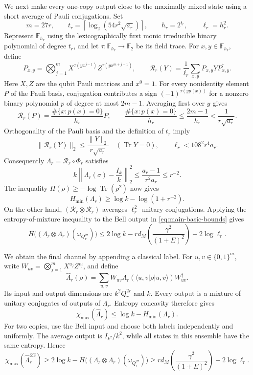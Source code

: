 We next make every one-copy output close to the maximally mixed state
using a short average of Pauli conjugations. Set
\[
 m=27r,\qquad
 t_r=\left\lceil\log_2(54r^2\sqrt{a_r})\right\rceil,
 \qquad h_r=2^{t_r},\qquad \ell_r=h_r^2.
\]
Represent $\mathbb F_{h_r}$ using the lexicographically first monic
irreducible binary polynomial of degree $t_r$, and let
$\tau:\mathbb F_{h_r}\to\mathbb F_2$ be its field trace.
For $x,y\in\mathbb F_{h_r}$, define
\[
 P_{x,y}=\bigotimes_{j=1}^{m}
 X^{\tau(yx^{j-1})}Z^{\tau(yx^{m+j-1})},
 \qquad
 \mathcal R_r(Y)=\frac1{\ell_r}\sum_{x,y}P_{x,y}YP_{x,y}^{\dagger}.
\]
Here $X,Z$ are the qubit Pauli matrices and $x^0=1$.
For every nonidentity element $P$ of the Pauli basis, conjugation contributes a
sign $(-1)^{\tau(yp(x))}$ for a nonzero binary polynomial $p$ of degree
at most $2m-1$. Averaging first over $y$ gives
\[
 \mathcal R_r(P)=\frac{\#\{x:p(x)=0\}}{h_r}P,
 \qquad
 \frac{\#\{x:p(x)=0\}}{h_r}\le\frac{2m-1}{h_r}
 <\frac1{r\sqrt{a_r}}.
\]
Orthogonality of the Pauli basis and the definition of $t_r$ imply
\begin{equation}\label{eq:main-randomizer}
 \|\mathcal R_r(Y)\|_2\le\frac{\|Y\|_2}{r\sqrt{a_r}}
 \quad(\operatorname{Tr}Y=0),\qquad
 \ell_r<108^2r^4a_r.
\end{equation}
Consequently $\Lambda_r=\mathcal R_r\circ\Phi_r$ satisfies
\[
 k\left\|\Lambda_r(\sigma)-\frac{I_k}{k}\right\|_2^2
 \le\frac{a_r-1}{r^2a_r}\le r^{-2}.
\]
The inequality $H(\rho)\ge-\log\operatorname{Tr}(\rho^2)$ now gives
\begin{equation}\label{eq:main-smoothed-single}
 H_{\min}(\Lambda_r)\ge\log k-\log(1+r^{-2}).
\end{equation}
On the other hand, $(\mathcal R_r\otimes\mathcal R_r)$ averages
$\ell_r^2$ unitary conjugations. Applying the entropy-of-mixture
inequality to the Bell output in \eqref{eq:main-basic-bounds} gives
\begin{equation}\label{eq:main-smoothed-double}
 H\bigl((\Lambda_r\otimes\Lambda_r)(\omega_{Q_r^{2r}})\bigr)
 \le 2\log k-rd_M\!\left(\frac{\gamma^2}{(1+E)^2}\right)
       +2\log\ell_r.
\end{equation}

We obtain the final channel by appending a classical label.
For $u,v\in\{0,1\}^{m}$, write
$W_{uv}=\bigotimes_{j=1}^{m}X^{u_j}Z^{v_j}$, and define
\begin{equation}\label{eq:main-weyl-extension}
 \widehat\Lambda_r(\rho)
 =\sum_{u,v}W_{uv}
 \Lambda_r\!\left(\langle u,v|\rho|u,v\rangle\right)W_{uv}^{\dagger}.
\end{equation}
Its input and output dimensions are $k^2Q_r^{2r}$ and $k$.
Every output is a mixture of unitary conjugates of outputs of $\Lambda_r$.
Entropy concavity therefore gives
\[
 \chi_{\max}(\widehat\Lambda_r)\le\log k-H_{\min}(\Lambda_r).
\]
For two copies, use the Bell input and choose both labels independently
and uniformly. The average output is $I_{k^2}/k^2$, while all states
in this ensemble have the same entropy. Hence
\[
 \chi_{\max}(\widehat\Lambda_r^{\otimes2})
 \ge 2\log k-H\bigl((\Lambda_r\otimes\Lambda_r)(\omega_{Q_r^{2r}})\bigr)
 \ge rd_M\!\left(\frac{\gamma^2}{(1+E)^2}\right)-2\log\ell_r.
\]

